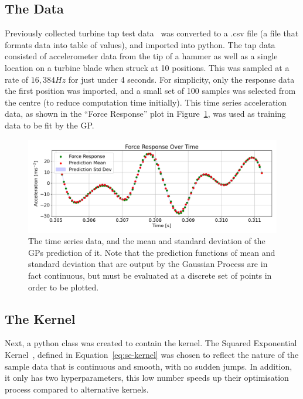 \documentclass[12pt]{article}
\begin{document}
    \subsection{The Data}
    Previously collected turbine tap test data~\cite{MEC326} was converted to a .csv file (a file that formats data into table of values), and imported into python.
    The tap data consisted of accelerometer data from the tip of a hammer as well as a single location on a turbine blade when struck at 10 positions.
    This was sampled at a rate of $16,384 Hz$ for just under 4 seconds.
    For simplicity, only the response data the first position was imported, and a small set of 100 samples was selected from the centre (to reduce computation time initially).
    This time series acceleration data, as shown in the ``Force Response'' plot in Figure~\ref{fig:input-response-plot}, was used as training data to be fit by the GP\@.

    \begin{figure}[ht]
        \centering
        \includegraphics[width=1.0\linewidth]{figures/input-response-plot/input-response-plot.png}
        \caption{The time series data, and the mean and standard deviation of the GPs prediction of it. Note that the prediction functions of mean and standard deviation that are output by the Gaussian Process are in fact continuous, but must be evaluated at a discrete set of points in order to be plotted.}
        \label{fig:input-response-plot}
    \end{figure}



    \subsection{The Kernel}
    Next, a python class was created to contain the kernel.
    The Squared Exponential Kernel~\cite{duvenaud2014kernel}, defined in Equation~\ref{eq:se-kernel} was chosen to reflect the nature of the sample data that is continuous and smooth, with no sudden jumps.
    In addition, it only has two hyperparameters, this low number speeds up their optimisation process compared to alternative kernels.
\end{document}
